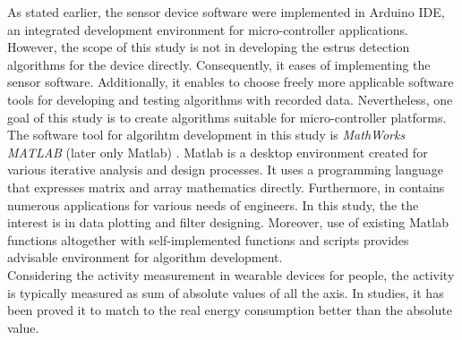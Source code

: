 \documentclass[english,12pt,a4paper,pdftex,elec,utf8]{aaltothesis}
\begin{document}
As stated earlier, the sensor device software were implemented in Arduino IDE, an integrated development environment for micro-controller applications. However, the scope of this study is not in developing the estrus detection algorithms for the device directly. Consequently, it eases of implementing the sensor software. Additionally, it enables to choose freely more applicable software tools for developing and testing algorithms with recorded data. Nevertheless, one goal of this study is to create algorithms suitable for micro-controller platforms. The software tool for algorihtm development in this study is \textit{MathWorks MATLAB} (later only Matlab) \cite{matlaboverview}. Matlab is a desktop environment created for various iterative analysis and design processes. It uses a programming language that expresses matrix and array mathematics directly. Furthermore, in contains numerous applications for various needs of engineers. In this study, the the interest is in data plotting and filter designing. Moreover, use of existing Matlab functions altogether with self-implemented functions and scripts provides advisable environment for algorithm development.  \\



Considering the activity measurement in wearable devices for people, the activity is typically measured as sum of absolute values of all the axis. In studies, it has been proved it to match to the real energy consumption better than the absolute value. \\
\end{document}
